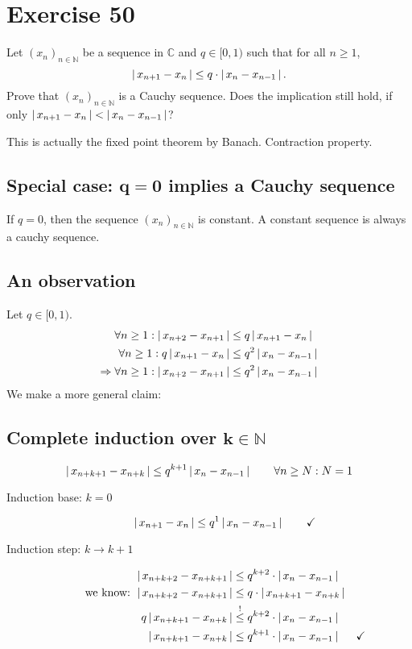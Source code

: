 \documentclass[a4paper]{article}
\theoremstyle{definition}
\newcommand\abs[1]{\left|\thinspace #1\thinspace\right|}
\newcommand\seq[1]{\left(#1\right)_{n\in\mathbb N}}
\begin{document}
\section{Exercise 50}
\begin{ex}
  Let $\seq{x_n}$ be a sequence in $\mathbb C$ and $q \in [0, 1)$ such that for all $n \geq 1$,
  \[ \abs{x_{n+1} - x_n} \leq q \cdot \abs{x_n - x_{n-1}}. \]
  Prove that $\seq{x_n}$ is a Cauchy sequence. Does the implication still hold, if only
  $\abs{x_{n+1} - x_n} < \abs{x_n - x_{n-1}}$?
\end{ex}

This is actually the fixed point theorem by Banach. Contraction property.

\subsection{Special case: $\mathbf{q=0}$ implies a Cauchy sequence}
%
If $q = 0$, then the sequence $\seq{x_n}$ is constant.
A constant sequence is always a cauchy sequence.

\subsection{An observation}
%
Let $q \in [0, 1)$.
\begin{align*}
  \forall n \geq 1: \abs{x_{n+2} - x_{n+1}} &\leq q \abs{x_{n+1} - x_n} \\
  \forall n \geq 1: q \abs{x_{n+1} - x_n} &\leq q^2 \abs{x_n - x_{n-1}} \\
  \Rightarrow \forall n \geq 1: \abs{x_{n+2} - x_{n+1}} &\leq q^2 \abs{x_n - x_{n-1}}
\end{align*}
We make a more general claim:

\subsection{Complete induction over $\mathbf{k \in \mathbb N}$}
%
\[ \abs{x_{n+k+1} - x_{n+k}} \leq q^{k+1} \abs{x_n - x_{n-1}} \qquad \forall n \geq N: N = 1 \]
\begin{description}
  \item[Induction base: $k = 0$]
    \[ \abs{x_{n+1} - x_n} \leq q^1 \abs{x_n - x_{n-1}} \qquad \checkmark \]
  \item[Induction step: $k \rightarrow k + 1$]
    \begin{align*}
      \abs{x_{n+k+2} - x_{n+k+1}} &\leq q^{k+2} \cdot \abs{x_n - x_{n-1}} \\
      \text{we know: } \abs{x_{n+k+2} - x_{n+k+1}} &\leq q \cdot \abs{x_{n+k+1} - x_{n+k}} \\
      q \abs{x_{n+k+1} - x_{n+k}} &\stackrel{!}{\leq} q^{k+2} \cdot \abs{x_n - x_{n-1}} \\
      \abs{x_{n+k+1} - x_{n+k}} &\leq q^{k+1} \cdot \abs{x_n - x_{n-1}} &\checkmark
    \end{align*}
\end{description}
\end{document}
